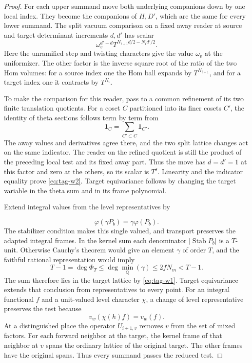 \begin{proof}
For each upper summand move both underlying companions down
by one local index. They become the companions of \(H,D'\),
which are the same for every lower summand. The split vacuum
comparison on a fixed away reader at source and target
determinant increments \(d,d'\) has scalar
\[
          \omega_v^{d'-d} T^{N_{i+1}d/2-N_i d'/2}.
\]
Here the unramified step and twisting characters give the
value \(\omega_v\) at the uniformizer. The other factor is
the inverse square root of the ratio of the two Hom volumes:
for a source index one the Hom ball expands by
\(T^{N_{i+1}}\), and for a target index one it contracts
by \(T^{N_i}\).

To make the comparison for this reader,
pass to a common refinement of its two finite translation
quotients. For a coset \(C\) partitioned into its finer cosets \(C'\), the identity of theta sections follows term by term from
\[
  \mathbf1_C=\sum_{C'\subset C}\mathbf1_{C'}.
\]
 The away values and derivatives agree there,
and the two split lattice changes act on the same indicator.
The reader on the refined quotient is still the product of
the preceding local test and its fixed away part. Thus the
move has \(d=d'=1\) at this factor and zero at the others,
so its scalar is \(T^s\). Linearity and the indicator equality
prove \eqref{eq:tag-w2}. Target equivariance follows by changing the
target variable in the theta sum and in its frame polynomial.
\label{cor:word-period-1}

Extend integral values from the level representatives by

\[
  \varphi(\gamma P_b)=\gamma\varphi(P_b).
\]
 The stabilizer
condition makes this single valued, and transport preserves
the adapted integral frames. In the kernel sum each denominator
\(|\operatorname{Stab}P_b|\) is a \(T\)-unit. Otherwise Cauchy's
theorem would give an element \(\gamma\) of order \(T\), and the
faithful rational representation would imply
\[
 T-1=\deg\Phi_T\le \deg\min_{\mathbb Q}(\gamma)
                         \le 2fN_m<T-1 .
\]
The sum therefore lies in the target lattice by \eqref{eq:tag-w1}.
Target equivariance extends that conclusion from representatives
to every point.
For an integral functional \(f\) and a unit-valued level character \(\chi\), a change of level representative preserves the test because
\[
  v_w(\chi(h)f)=v_w(f) .
\]
At a distinguished place the operator \(U_{i+1,v}\) removes \(v\)
from the set of mixed factors. For each forward neighbor at the
target, the kernel frame of that neighbor at \(v\) spans the
ordinary lattice of the original target. The other frames have
the original spans. Thus every summand passes the reduced test.


\end{proof}

